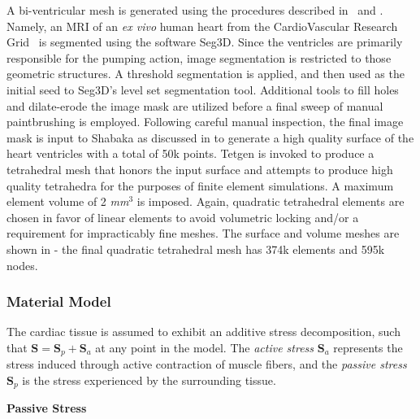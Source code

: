 A bi-ventricular mesh is generated using the procedures described in~ and . Namely, an MRI of an \textit{ex vivo} human heart from the CardioVascular Research Grid~\cite{cvgg} is segmented using the software Seg3D. Since the ventricles are primarily responsible for the pumping action, image segmentation is restricted to those geometric structures. A threshold segmentation is applied, and then used as the initial seed to Seg3D's level set segmentation tool. Additional tools to fill holes and dilate-erode the image mask are utilized before a final sweep of manual paintbrushing is employed. Following careful manual inspection, the final image mask is input to Shabaka as discussed in  to generate a high quality surface of the heart ventricles with a total of 50k points. Tetgen is invoked to produce a tetrahedral mesh that honors the input surface and attempts to produce high quality tetrahedra for the purposes of finite element simulations. A maximum element volume of 2 \textit{mm$^3$} is imposed. Again, quadratic tetrahedral elements are chosen in favor of linear elements to avoid volumetric locking and/or a requirement for impracticably fine meshes. The surface and volume meshes are shown in  - the final quadratic tetrahedral mesh has 374k elements and 595k nodes.

\subsubsection{Material Model}
\label{Material Model}

The cardiac tissue is assumed to exhibit an additive stress decomposition, such that $\bm{S} = \bm{S}_p + \bm{S}_a$ at any point in the model. The \textit{active stress} $\bm{S}_a$ represents the stress induced through active contraction of muscle fibers, and the \textit{passive stress} $\bm{S}_p$ is the stress experienced by the surrounding tissue.

\textbf{Passive Stress}


